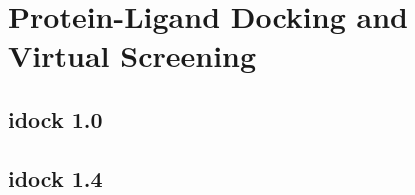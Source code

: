\chapter{Protein-Ligand Docking and Virtual Screening}

\section{idock 1.0}



\section{idock 1.4}



\chapterend
